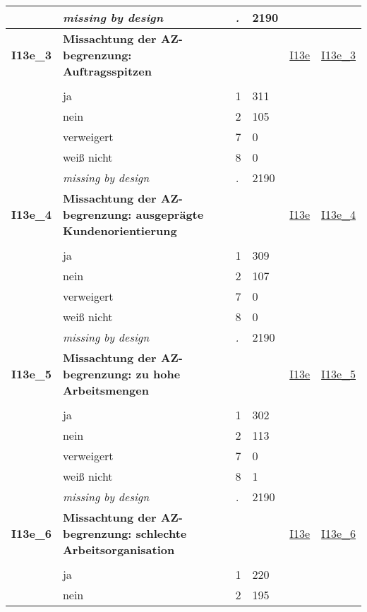 \begin{longtable}{| L{2.45cm} | L{6cm} | C{1.5cm} | R{1cm} | C{2.25cm} | C{2.25cm} |}
   & \textit{missing by design} & \textit{.} & 2190 &  &  \\ 
   \midrule
\textbf{I13e\_3}\label{var:I13e:3} & \textbf{Missachtung der AZ-begrenzung: Auftragsspitzen} &  &  & \hyperref[I13e]{I13e} & \hyperref[var:suf:I13e:3]{I13e\_3} \\ 
   &  &  &  &  &  \\ 
   & ja & 1 & 311 &  &  \\ 
   & nein & 2 & 105 &  &  \\ 
   & verweigert & 7 & 0 &  &  \\ 
   & weiß nicht & 8 & 0 &  &  \\ 
   & \textit{missing by design} & \textit{.} & 2190 &  &  \\ 
   \midrule
\textbf{I13e\_4}\label{var:I13e:4} & \textbf{Missachtung der AZ-begrenzung: ausgeprägte Kundenorientierung} &  &  & \hyperref[I13e]{I13e} & \hyperref[var:suf:I13e:4]{I13e\_4} \\ 
   &  &  &  &  &  \\ 
   & ja & 1 & 309 &  &  \\ 
   & nein & 2 & 107 &  &  \\ 
   & verweigert & 7 & 0 &  &  \\ 
   & weiß nicht & 8 & 0 &  &  \\ 
   & \textit{missing by design} & \textit{.} & 2190 &  &  \\ 
   \midrule
\textbf{I13e\_5}\label{var:I13e:5} & \textbf{Missachtung der AZ-begrenzung: zu hohe Arbeitsmengen} &  &  & \hyperref[I13e]{I13e} & \hyperref[var:suf:I13e:5]{I13e\_5} \\ 
   &  &  &  &  &  \\ 
   & ja & 1 & 302 &  &  \\ 
   & nein & 2 & 113 &  &  \\ 
   & verweigert & 7 & 0 &  &  \\ 
   & weiß nicht & 8 & 1 &  &  \\ 
   & \textit{missing by design} & \textit{.} & 2190 &  &  \\ 
   \midrule
\textbf{I13e\_6}\label{var:I13e:6} & \textbf{Missachtung der AZ-begrenzung: schlechte Arbeitsorganisation} &  &  & \hyperref[I13e]{I13e} & \hyperref[var:suf:I13e:6]{I13e\_6} \\ 
   &  &  &  &  &  \\ 
   & ja & 1 & 220 &  &  \\ 
   & nein & 2 & 195 &  &  \\ 

\end{longtable}
